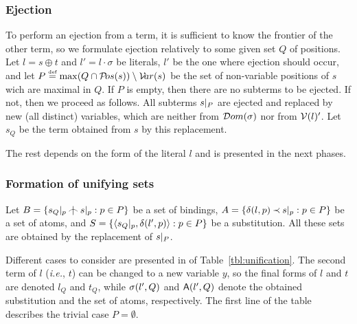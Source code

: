\subsubsection{Ejection}

To perform an ejection from a term, it is sufficient to know the frontier
of the other term, so we formulate ejection relatively to some given
set $Q$ of positions.  Let \(l= s\oplus t\) and \(l'=l\cdot \sigma\) be
literals, $l'$ be the one where ejection should occur, and let \(P
\mathrel {\stackrel {\mbox {\tiny def}}{=}} \max(Q\cap{\sl{\cal P}\!os}(s))\setminus {\sl{\cal V}\!ar}(s)\) be the set of non-variable positions of
$s$ wich are maximal in $Q$.  If $P$ is empty, then there are no
subterms to be ejected.  If not, then we proceed as follows.  All subterms
\(s|_{P}\) are ejected and replaced by new (all distinct) variables,
which are neither from \({\sl{\cal D}om} (\sigma)\) nor from \({\cal V}(l)'\).  Let $s_Q$ be
the term obtained from $s$ by this replacement. 

The rest depends on the form of the literal $l$ and is presented in the next
phases. 

\subsubsection{Formation of unifying sets}

Let \(B =\{\subterm {s_Q} p\notInt \subterm sp: p\in P\}\) be a set of
bindings, \(A =\{\delta(l,p)\mathbin{\prec} s|_{p}: p\in P\}\) be a set of atoms,
and \(S =\{\langle s_Q|_{p} ,\delta(l',p)\rangle: p\in P\}\) be a substitution. All
these sets are obtained by the replacement of \(s|_{P}\).

Different cases to consider are presented in 
of Table~\ref {tbl:unification}.  The second term of $l$ ({\it i.e.}, $t$)
can be changed to a new variable $y$, so the final forms of $l$ and $t$ are
denoted $l_Q$ and $t_Q$, while \(\sigma(l',Q)\) and \({\sf A}(l',Q)\) denote the
obtained substitution and the set of atoms, respectively.  The first line of
the table describes the trivial case \(P=\emptyset\).

